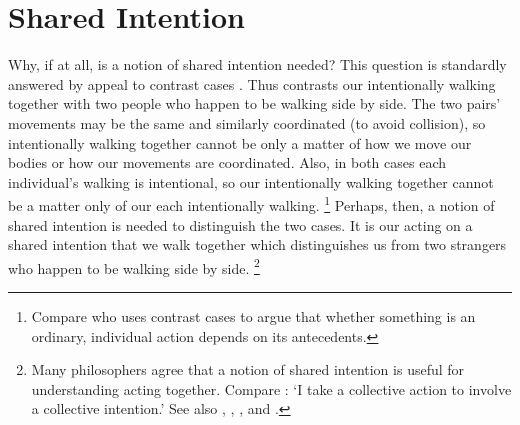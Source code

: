 \documentclass[12pt,\papersize]{extarticle}
\begin{document}
\setlength\footnotesep{1em}


\maketitle
\title{}

\begin{abstract}
\noindent
***

\end{abstract}

\section{Shared Intention}
Why, if at all, is a notion of shared intention needed? 
This question is standardly answered by appeal to contrast cases \citep[compare][p.\ 150]{Bratman:2009lv}.
Thus \citet{gilbert_walking_1990} contrasts our intentionally walking together with two people who happen to be walking side by side. 
The two pairs' movements may be the same and similarly coordinated (to avoid collision), so intentionally walking together cannot be only a matter of how we move our bodies or how our movements are coordinated. 
Also, in both cases each individual's walking is intentional, so our intentionally walking together cannot be a matter only of our each intentionally walking.%
\footnote{
Compare \citet{Pears:1971fk} who uses contrast cases to argue that whether something is an ordinary, individual action depends on its antecedents. 
}  
Perhaps, then, a notion of shared intention is needed to distinguish the two cases.
It is our acting on a shared intention that we walk together which distinguishes us from two strangers who happen to be walking side by side.%
\footnote{
Many philosophers agree that a notion of shared intention is useful for understanding acting together. 
Compare \citet[p.\ 5]{Gilbert:2006wr}: `I take a collective action to involve a collective intention.'  See also  
	\citet[p.\ 381]{Carpenter:2009wq}, 
	\citet[p.\ 369]{Call:2009fk}, 
	\citet{Kutz:2000si}, 
	\citet[p.\ 117]{rakoczy_pretend_2006} and 
	\citet{Tollefsen:2005vh}.
	}
	
\end{document}
